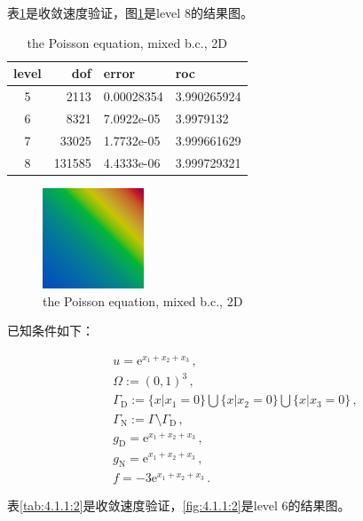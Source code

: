 表\ref{tab:4.1.1:1}是收敛速度验证，图\ref{fig:4.1.1:1}是level 8的结果图。
\begin{table}[!htbp]\label{tab:4.1.1:1}
  \centering
  \begin{tabular}{c|r|l|l}
    level      &    dof   &         error  &         roc\\
    \hline
    5         &     2113  &         0.00028354  &    3.990265924 \\
    \hline
    6         &     8321  &         7.0922e-05  &    3.9979132 \\
    \hline
    7         &     33025 &         1.7732e-05  &    3.999661629 \\
    \hline
    8         &     131585 &        4.4333e-06  &    3.999729321
  \end{tabular}
  \caption{the Poisson equation, mixed b.c., 2D}
\end{table}

\begin{figure}[!htbp]
  \centering
  \includegraphics[height=3cm]{fig/4/fig:1.1.1:1.png}
  \caption{the Poisson equation, mixed b.c., 2D}
  \label{fig:4.1.1:1}
\end{figure}

已知条件如下：

\begin{subequations}
  \begin{align*}
   &u=\mathrm e^{x_1+x_2+x_3}\,,\\
   &\Omega:=(0,1)^3\,,\\
   &\Gamma_{\mathrm D}:=\{x|x_1=0\}\bigcup\{x|x_2=0\}\bigcup\{x|x_3=0\}\,,\\
   &\Gamma_{\mathrm N}:=\Gamma\setminus\Gamma_{\mathrm D}\,, \\
   &g_{\mathrm D}=\mathrm e^{x_1+x_2+x_3}\,,\\
   &g_{\mathrm N}=\mathrm e^{x_1+x_2+x_3}\,,\\
    &f=-3\mathrm e^{x_1+x_2+x_3}\,.
  \end{align*}
\end{subequations}


   
表\ref{tab:4.1.1:2}是收敛速度验证，\ref{fig:4.1.1:2}是level 6的结果图。

